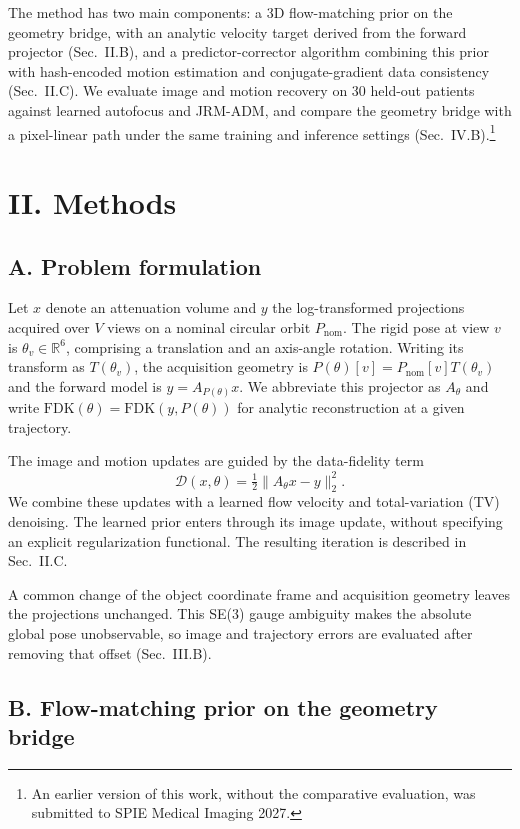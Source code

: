 \documentclass[11pt]{article}
\newcommand{\FDK}{\mathrm{FDK}}
\newcommand{\Pnom}{P_{\mathrm{nom}}}
\begin{document}
The method has two main components: a 3D flow-matching prior on the geometry bridge,
with an analytic velocity target derived from the forward projector
(Sec.~II.B), and a predictor-corrector algorithm combining this prior with
hash-encoded motion estimation and conjugate-gradient data consistency
(Sec.~II.C). We evaluate image and motion recovery on 30 held-out patients
against learned autofocus and JRM-ADM, and compare the geometry bridge with a
pixel-linear path under the same training and inference settings
(Sec.~IV.B).\footnote{An earlier version of this work, without the
comparative evaluation, was submitted to SPIE Medical Imaging 2027.}

\section{II. Methods}


\subsection{A. Problem formulation}


Let $x$ denote an attenuation volume and $y$ the log-transformed projections acquired
over $V$ views on a nominal circular orbit $\Pnom$. The rigid pose at view $v$ is
$\theta_v\in\mathbb{R}^6$, comprising a translation and an axis-angle rotation.
Writing its transform as $T(\theta_v)$, the acquisition geometry is
$P(\theta)[v]=\Pnom[v]T(\theta_v)$ and the forward model is
$y=A_{P(\theta)}x$. We abbreviate this projector as $A_\theta$ and write
$\FDK(\theta)=\FDK(y,P(\theta))$ for analytic reconstruction at a given trajectory.

The image and motion updates are guided by the data-fidelity term
\begin{equation}
\mathcal{D}(x,\theta)=\tfrac12\|A_\theta x-y\|_2^2.

\end{equation}
We combine these updates with a learned flow velocity and total-variation (TV)
denoising. The learned prior enters through its image update, without specifying an
explicit regularization functional. The resulting iteration is described in
Sec.~II.C.

A common change of the object coordinate frame and acquisition geometry leaves the
projections unchanged. This SE(3) gauge ambiguity makes the absolute global pose
unobservable, so image and trajectory errors are evaluated after removing that offset
(Sec.~III.B).

\subsection{B. Flow-matching prior on the geometry bridge}
\end{document}
